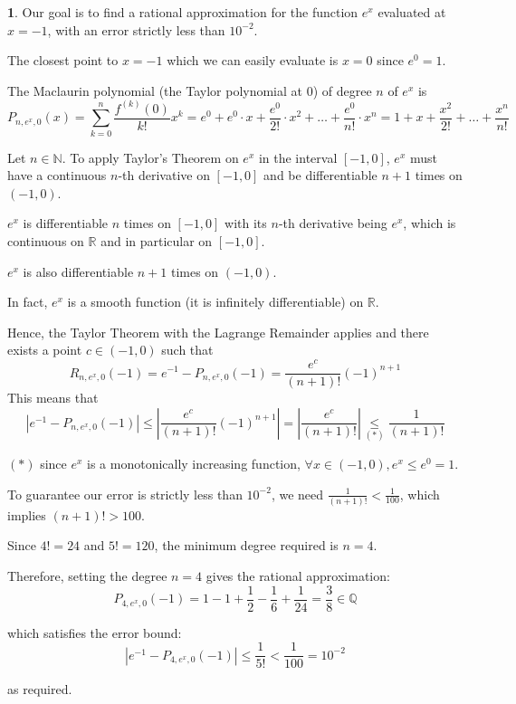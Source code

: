 \documentclass[english]{article}
\theoremstyle{plain}
\theoremstyle{definition}
\theoremstyle{definition}
\newtheorem*{sol*}{\protect\solutionname}
\providecommand{\solutionname}{Solution}
\begin{document}
\begin{sol*}
Our goal is to find a rational approximation for the function $e^{x}$
evaluated at $x=-1$, with an error strictly less than $10^{-2}$.

The closest point to $x=-1$ which we can easily evaluate is $x=0$
since $e^{0}=1$.

The Maclaurin polynomial (the Taylor polynomial at 0) of degree $n$
of $e^{x}$ is 
\[
P_{n,e^{x},0}(x)=\underset{k=0}{\overset{n}{\sum}}\frac{f^{(k)}(0)}{k!}x^{k}=e^{0}+e^{0}\cdot x+\frac{e^{0}}{2!}\cdot x^{2}+\dots+\frac{e^{0}}{n!}\cdot x^{n}=1+x+\frac{x^{2}}{2!}+\dots+\frac{x^{n}}{n!}
\]

Let $n\in\mathbb{N}$. To apply Taylor's Theorem on $e^{x}$ in the
interval $\left[-1,0\right]$, $e^{x}$ must have a continuous $n$-th
derivative on $\left[-1,0\right]$ and be differentiable $n+1$ times
on $\left(-1,0\right)$.

$e^{x}$ is differentiable $n$ times on $\left[-1,0\right]$ with
its $n$-th derivative being $e^{x}$, which is continuous on $\mathbb{R}$
and in particular on $\left[-1,0\right]$.

$e^{x}$ is also differentiable $n+1$ times on $\left(-1,0\right)$.

In fact, $e^{x}$ is a smooth function (it is infinitely differentiable)
on $\mathbb{R}$.

Hence, the Taylor Theorem with the Lagrange Remainder applies and
there exists a point $c\in\left(-1,0\right)$ such that 
\[
R_{n,e^{x},0}(-1)=e^{-1}-P_{n,e^{x},0}(-1)=\frac{e^{c}}{\left(n+1\right)!}\left(-1\right)^{n+1}
\]
 This means that 
\[
\left|e^{-1}-P_{n,e^{x},0}(-1)\right|\le\left|\frac{e^{c}}{\left(n+1\right)!}\left(-1\right)^{n+1}\right|=\left|\frac{e^{c}}{\left(n+1\right)!}\right|\underset{\left(*\right)}{\le}\frac{1}{\left(n+1\right)!}
\]

$\left(*\right)$ since $e^{x}$ is a monotonically increasing function,
$\forall x\in\left(-1,0\right),e^{x}\le e^{0}=1$.

To guarantee our error is strictly less than $10^{-2}$, we need $\frac{1}{(n+1)!}<\frac{1}{100}$,
which implies $(n+1)!>100$.

Since $4!=24$ and $5!=120$, the minimum degree required is $n=4$.

Therefore, setting the degree $n=4$ gives the rational approximation:
\[
P_{4,e^{x},0}\left(-1\right)=1-1+\frac{1}{2}-\frac{1}{6}+\frac{1}{24}=\frac{3}{8}\in\mathbb{Q}
\]

which satisfies the error bound:
\[
\left|e^{-1}-P_{4,e^{x},0}(-1)\right|\le\frac{1}{5!}<\frac{1}{100}=10^{-2}
\]

as required.
\end{sol*}
\medskip{}
\end{document}
